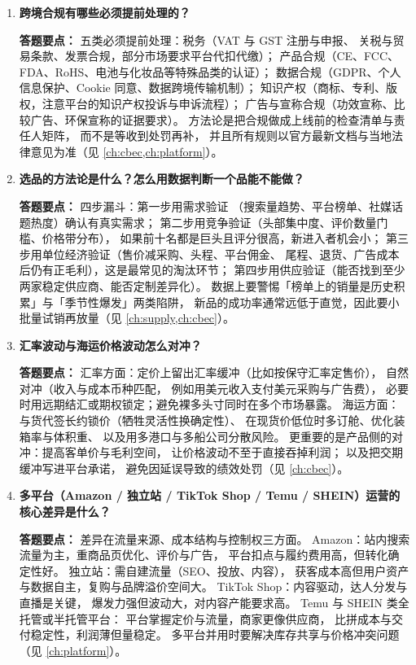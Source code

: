 \begin{interview}[题库与答题要点]
\begin{enumerate}[label=]
  \item[\textcolor{VioletDeep}{\textbf{Q109.}}] \textbf{跨境合规有哪些必须提前处理的？}
\par\smallskip\noindent\textcolor{VioletDeep}{\textbf{答题要点：}}
五类必须提前处理：税务（VAT 与 GST 注册与申报、
关税与贸易条款、发票合规，部分市场要求平台代扣代缴）；
产品合规（CE、FCC、FDA、RoHS、电池与化妆品等特殊品类的认证）；
数据合规（GDPR、个人信息保护、Cookie 同意、数据跨境传输机制）；
知识产权（商标、专利、版权，注意平台的知识产权投诉与申诉流程）；
广告与宣称合规（功效宣称、比较广告、环保宣称的证据要求）。
方法论是把合规做成上线前的检查清单与责任人矩阵，
而不是等收到处罚再补，
并且所有规则以官方最新文档与当地法律意见为准（见 \cref{ch:cbec,ch:platform}）。

  \item[\textcolor{VioletDeep}{\textbf{Q110.}}] \textbf{选品的方法论是什么？怎么用数据判断一个品能不能做？}
\par\smallskip\noindent\textcolor{VioletDeep}{\textbf{答题要点：}}
四步漏斗：第一步用需求验证
（搜索量趋势、平台榜单、社媒话题热度）确认有真实需求；
第二步用竞争验证（头部集中度、评价数量门槛、价格带分布），
如果前十名都是巨头且评分很高，新进入者机会小；
第三步用单位经济验证（售价减采购、头程、平台佣金、
尾程、退货、广告成本后仍有正毛利），这是最常见的淘汰环节；
第四步用供应验证（能否找到至少两家稳定供应商、能否定制差异化）。
数据上要警惕「榜单上的销量是历史积累」与「季节性爆发」两类陷阱，
新品的成功率通常远低于直觉，因此要小批量试销再放量（见 \cref{ch:supply,ch:cbec}）。

  \item[\textcolor{VioletDeep}{\textbf{Q111.}}] \textbf{汇率波动与海运价格波动怎么对冲？}
\par\smallskip\noindent\textcolor{VioletDeep}{\textbf{答题要点：}}
汇率方面：定价上留出汇率缓冲（比如按保守汇率定售价），
自然对冲（收入与成本币种匹配，
例如用美元收入支付美元采购与广告费），
必要时用远期结汇或期权锁定；避免裸多头寸同时在多个市场暴露。
海运方面：与货代签长约锁价（牺牲灵活性换确定性）、
在现货价低位时多订舱、优化装箱率与体积重、
以及用多港口与多船公司分散风险。
更重要的是产品侧的对冲：提高客单价与毛利空间，
让价格波动不至于直接吞掉利润；
以及把交期缓冲写进平台承诺，
避免因延误导致的绩效处罚（见 \cref{ch:cbec}）。

  \item[\textcolor{VioletDeep}{\textbf{Q112.}}] \textbf{多平台（Amazon / 独立站 / TikTok Shop / Temu / SHEIN）运营的核心差异是什么？}
\par\smallskip\noindent\textcolor{VioletDeep}{\textbf{答题要点：}}
差异在流量来源、成本结构与控制权三方面。
Amazon：站内搜索流量为主，重商品页优化、评价与广告，
平台扣点与履约费用高，但转化确定性好。
独立站：需自建流量（SEO、投放、内容），
获客成本高但用户资产与数据自主，复购与品牌溢价空间大。
TikTok Shop：内容驱动，达人分发与直播是关键，
爆发力强但波动大，对内容产能要求高。
Temu 与 SHEIN 类全托管或半托管平台：
平台掌握定价与流量，商家更像供应商，
比拼成本与交付稳定性，利润薄但量稳定。
多平台并用时要解决库存共享与价格冲突问题（见 \cref{ch:platform}）。


\end{enumerate}
\end{interview}
